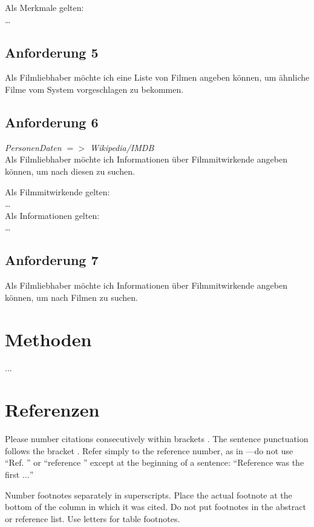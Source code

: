 \documentclass[conference]{IEEEtran}
\begin{document}
Als Merkmale gelten:
\\
\dots
\\

\subsection{Anforderung 5}

Als Filmliebhaber möchte ich eine Liste von Filmen angeben können,
um ähnliche Filme vom System vorgeschlagen zu bekommen.

\subsection{Anforderung 6}
\textit{PersonenDaten $=>$ Wikipedia/IMDB}
\\
Als Filmliebhaber möchte ich Informationen über Filmmitwirkende angeben können,
um nach diesen zu suchen.

Als Filmmitwirkende gelten:
\\
\dots
\\
Als Informationen gelten:
\\
\dots
\\
\subsection{Anforderung 7}
Als Filmliebhaber möchte ich Informationen über Filmmitwirkende angeben können,
um nach Filmen zu suchen.


\section{Methoden}

...





\section*{Referenzen}

Please number citations consecutively within brackets \cite{b1}. The 
sentence punctuation follows the bracket \cite{b2}. Refer simply to the reference 
number, as in \cite{b3}---do not use ``Ref. \cite{b3}'' or ``reference \cite{b3}'' except at 
the beginning of a sentence: ``Reference \cite{b3} was the first $\ldots$''

Number footnotes separately in superscripts. Place the actual footnote at 
the bottom of the column in which it was cited. Do not put footnotes in the 
abstract or reference list. Use letters for table footnotes.
\end{document}
